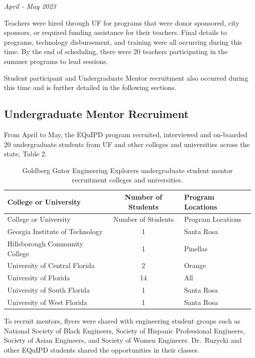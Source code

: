 \documentclass[
]{article}
\begin{document}
\emph{April - May 2023}

Teachers were hired through UF for programs that were donor sponsored,
city sponsors, or required funding assistance for their teachers. Final
details to programs, technology disbursement, and training were all
occurring during this time. By the end of scheduling, there were 20
teachers participating in the summer programs to lead sessions.

Student participant and Undergraduate Mentor recruitment also occurred
during this time and is further detailed in the following sections.

\hypertarget{undergraduate-mentor-recruiment}{%
\subsection{Undergraduate Mentor
Recruiment}\label{undergraduate-mentor-recruiment}}

From April to May, the EQuIPD program recruited, interviewed and
on-boarded 20 undergraduate students from UF and other colleges and
universities across the state, Table 2.

\begin{longtable}[]{@{}lcl@{}}
\caption{Goldberg Gator Engineering Explorers undergraduate student
mentor recruitment colleges and universities.}\tabularnewline
\toprule\noalign{}
College or University & Number of Students & Program Locations \\
\midrule\noalign{}
\endfirsthead
\toprule\noalign{}
College or University & Number of Students & Program Locations \\
\midrule\noalign{}
\endhead
\bottomrule\noalign{}
\endlastfoot
Georgia Institute of Technology & 1 & Santa Rosa \\
Hillsborough Community College & 1 & Pinellas \\
University of Central Florida & 2 & Orange \\
University of Florida & 14 & All \\
University of South Florida & 1 & Santa Rosa \\
University of West Florida & 1 & Santa Rosa \\
\end{longtable}

To recruit mentors, flyers were shared with engineering student groups
such as National Society of Black Engineers, Society of Hispanic
Professional Engineers, Society of Asian Engineers, and Society of Women
Engineers. Dr.~Ruzycki and other EQuIPD students shared the
opportunities in their classes.
\end{document}
